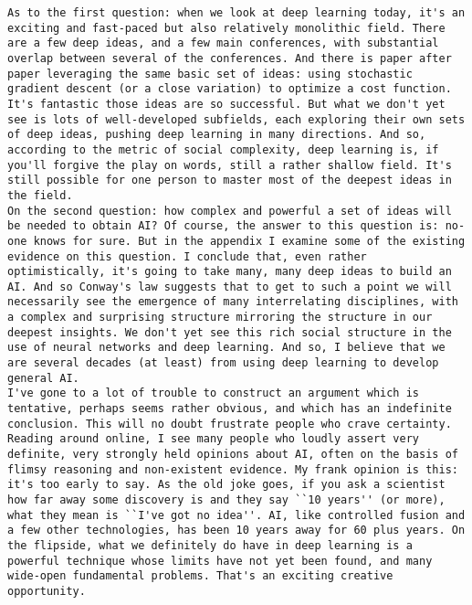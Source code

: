 \begin{lstlisting}
As to the first question: when we look at deep learning today, it's an exciting and fast-paced but also relatively monolithic field. There are a few deep ideas, and a few main conferences, with substantial overlap between several of the conferences. And there is paper after paper leveraging the same basic set of ideas: using stochastic gradient descent (or a close variation) to optimize a cost function. It's fantastic those ideas are so successful. But what we don't yet see is lots of well-developed subfields, each exploring their own sets of deep ideas, pushing deep learning in many directions. And so, according to the metric of social complexity, deep learning is, if you'll forgive the play on words, still a rather shallow field. It's still possible for one person to master most of the deepest ideas in the field.
On the second question: how complex and powerful a set of ideas will be needed to obtain AI? Of course, the answer to this question is: no-one knows for sure. But in the appendix I examine some of the existing evidence on this question. I conclude that, even rather optimistically, it's going to take many, many deep ideas to build an AI. And so Conway's law suggests that to get to such a point we will necessarily see the emergence of many interrelating disciplines, with a complex and surprising structure mirroring the structure in our deepest insights. We don't yet see this rich social structure in the use of neural networks and deep learning. And so, I believe that we are several decades (at least) from using deep learning to develop general AI.
I've gone to a lot of trouble to construct an argument which is tentative, perhaps seems rather obvious, and which has an indefinite conclusion. This will no doubt frustrate people who crave certainty. Reading around online, I see many people who loudly assert very definite, very strongly held opinions about AI, often on the basis of flimsy reasoning and non-existent evidence. My frank opinion is this: it's too early to say. As the old joke goes, if you ask a scientist how far away some discovery is and they say ``10 years'' (or more), what they mean is ``I've got no idea''. AI, like controlled fusion and a few other technologies, has been 10 years away for 60 plus years. On the flipside, what we definitely do have in deep learning is a powerful technique whose limits have not yet been found, and many wide-open fundamental problems. That's an exciting creative opportunity.


\end{lstlisting}
